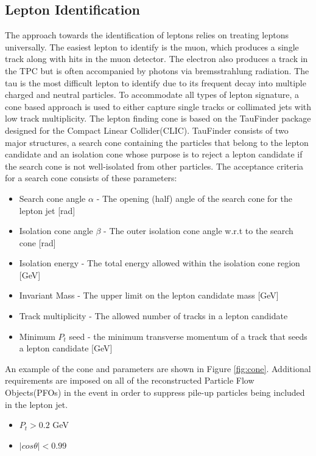 \subsection{Lepton Identification}
\label{subsec:Lepton_ID}
The approach towards the identification of leptons relies on treating leptons universally. The easiest lepton to identify is the muon, which produces a single track along with hits in the muon detector. The electron also produces a track in the TPC but is often accompanied by photons via bremsstrahlung radiation. The tau is the most difficult lepton to identify due to its frequent decay into multiple charged and neutral particles. To accommodate all types of lepton signature, a cone based approach is used to either capture single tracks or collimated jets with low track multiplicity. The lepton finding cone is based on the TauFinder package \cite{taufinder} designed for the Compact Linear Collider(CLIC). TauFinder consists of two major structures, a search cone containing the particles that belong to the lepton candidate and an isolation cone whose purpose is to reject a lepton candidate if the search cone is not well-isolated from other particles. The acceptance criteria for a search cone consists of these parameters:
\begin{itemize}
\item Search cone angle $\alpha$ - The opening (half) angle of the search cone for the lepton jet [rad]
\item Isolation cone angle $\beta$ - The outer isolation cone angle w.r.t to the search cone [rad]
\item Isolation energy - The total energy allowed within the isolation cone region [GeV]
\item Invariant Mass - The upper limit on the lepton candidate mass [GeV]
\item Track multiplicity - The allowed number of tracks in a lepton candidate
\item Minimum $P_t$ seed - the minimum transverse momentum of a track that seeds a lepton candidate [GeV] 
\end{itemize}
An example of the cone and parameters are shown in Figure \ref{fig:cone}. Additional requirements are imposed on all of the reconstructed Particle Flow Objects(PFOs) in the event in order to suppress pile-up particles being included in the lepton jet.
\begin{itemize}
\item $P_t > 0.2$ GeV
\item $|cos\theta| < 0.99$
\end{itemize}
